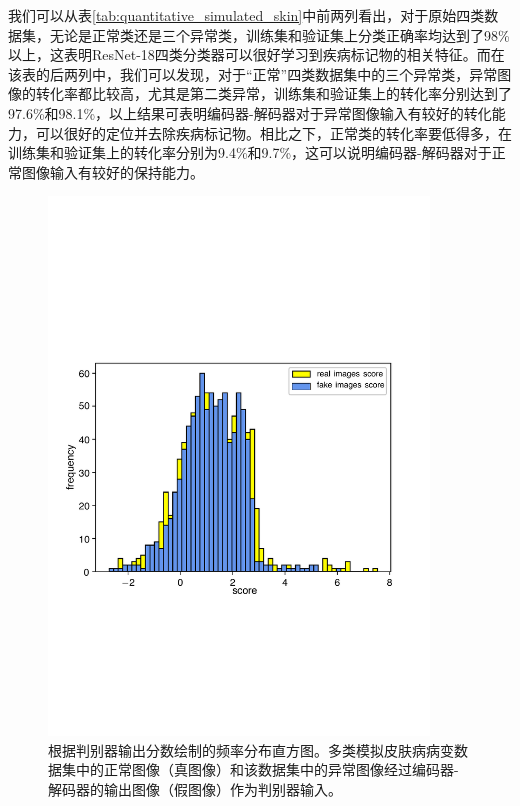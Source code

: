 我们可以从表\ref{tab:quantitative_simulated_skin}中前两列看出，对于原始四类数据集，无论是正常类还是三个异常类，训练集和验证集上分类正确率均达到了98\%以上，这表明ResNet-18四类分类器可以很好学习到疾病标记物的相关特征。而在该表的后两列中，我们可以发现，对于“正常”四类数据集中的三个异常类，异常图像的转化率都比较高，尤其是第二类异常，训练集和验证集上的转化率分别达到了97.6\%和98.1\%，以上结果可表明编码器-解码器对于异常图像输入有较好的转化能力，可以很好的定位并去除疾病标记物。相比之下，正常类的转化率要低得多，在训练集和验证集上的转化率分别为9.4\%和9.7\%，这可以说明编码器-解码器对于正常图像输入有较好的保持能力。
\begin{figure}[h]
	\centering
	\includegraphics[width=0.9\textwidth]{figure/simulated_skin_score_distribution.pdf}
	\caption[根据判别器输出分数绘制的频率分布直方图]{根据判别器输出分数绘制的频率分布直方图。多类模拟皮肤病病变数据集中的正常图像（真图像）和该数据集中的异常图像经过编码器-解码器的输出图像（假图像）作为判别器输入。}
	\label{fig:simulated_skin_hist_freq}
\end{figure}

